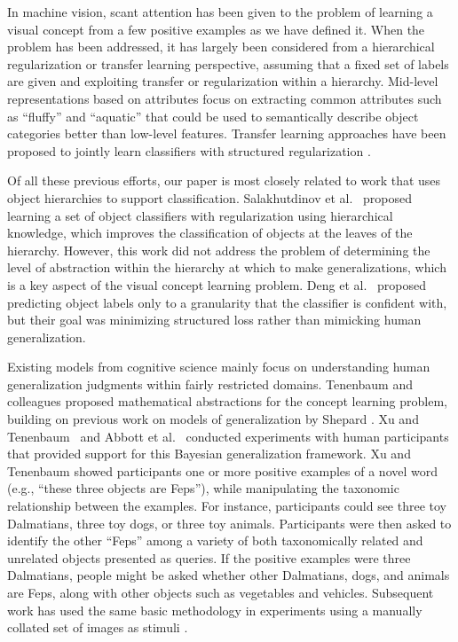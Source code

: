 In machine vision, scant attention has been given to the problem of learning a visual concept from a few positive examples as we have defined it. When the problem has been
addressed, it has largely been considered from a hierarchical regularization
\cite{salakhutdinov2011learning} or transfer learning
\cite{quattoni2008transfer} perspective, assuming that a fixed
set of labels are given and exploiting transfer or regularization within a
hierarchy. Mid-level representations based on attributes
\cite{farhadi2009describing,parikh2011relative} focus on extracting common
attributes such as ``fluffy'' and ``aquatic'' that could be used to
semantically describe object categories better than low-level
features. Transfer learning approaches have been proposed to jointly learn
classifiers with structured regularization \cite{quattoni2008transfer}.

Of all these previous efforts, our paper is most closely related to work
that uses object hierarchies to support classification. Salakhutdinov et
al.~\cite{salakhutdinov2011learning} proposed learning a set of object
classifiers with regularization using hierarchical knowledge, which
improves the classification of objects at the leaves of the hierarchy.
However, this work did not address the problem of determining the level of
abstraction within the hierarchy at which to make generalizations, which
is a key aspect of the visual concept learning problem. Deng et
al.~\cite{deng2012hedging} proposed predicting object labels only to a
granularity that the classifier is confident with, but their goal
was minimizing structured loss rather than mimicking human generalization.

Existing models from cognitive science mainly focus on understanding
human generalization judgments within fairly restricted domains. Tenenbaum
and colleagues \cite{tenenbaum99,tenenbaum2001generalization} proposed
mathematical abstractions for the concept learning problem, building on
previous work on models of generalization by Shepard \cite{shepard87}. Xu
and Tenenbaum~\cite{xu2007word} and Abbott et al.~\cite{abbott2012} conducted
experiments with human participants that provided support for this
Bayesian generalization framework. Xu and Tenenbaum \cite{xu2007word} showed participants one or more positive examples of a novel word (e.g., ``these three objects are Feps''), while manipulating the taxonomic relationship between the examples. For instance, participants could see three toy Dalmatians, three toy dogs, or three toy animals. Participants were then asked to identify the other ``Feps'' among a variety of both taxonomically related and unrelated objects presented as queries. If the positive examples were three Dalmatians, people might be asked whether other Dalmatians, dogs, and animals are Feps, along with other objects such as vegetables and vehicles. Subsequent work has used the same basic methodology in experiments using a manually collated set of images as stimuli \cite{abbott2012}.


